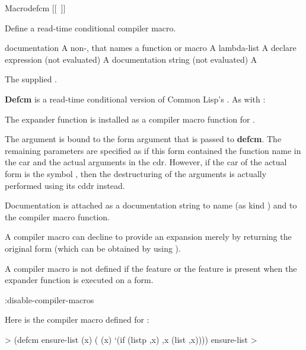 \documentclass[10pt,twoside,english,pdftex]{article}
\begin{document}
\begin{functiondoc}{Macro}{defcm}{ 
    \mbox{[[\superstar{} \vbar{} ]]}
    \superstar
    \returns{} }
%
%

\fnsyntax

\fnpurpose Define a read-time conditional compiler macro.

\fnpackage {}

\fnmodule {}

\fnargs
\begin{args}{documentation}
\arg[name] A non-\nil,  that names a function or macro
 A lambda-list
\arg[declaration] A declare expression (not evaluated)
\arg[documentation] A documentation string (not evaluated)
\arg[form] A 
\end{args}

\fnreturns The supplied .

\fndescription 
%
\textbf{Defcm} is a read-time conditional version of Common Lisp's
.  As with :
%
\begin{tightitemize}
\item The expander function is installed as a compiler macro function for
  .
\item The  argument is bound to the form argument that is passed
  to \textbf{defcm}. The remaining  parameters are
  specified as if this form contained the function name in the car and the
  actual arguments in the cdr.  However, if the car of the actual form is the
  symbol , then the destructuring of the arguments is actually
  performed using its cddr instead.
\item Documentation is attached as a documentation string to name (as kind
  ) and to the compiler macro function.
\item A compiler macro can decline to provide an expansion merely by returning
  the original form (which can be obtained by using ).
\end{tightitemize}
%
A compiler macro is not defined if the feature
\textbf{} or the feature
\textbf{} is present when the expander function is
executed on a form.

\begin{alsos}{:disable-compiler-macros}
\end{alsos}

\fnexample
%
%
%
%
Here is the compiler macro defined for \textbf{}:
%
\W\supp
\begin{example}
  > (defcm ensure-list (x)
      ( (x)
        `(if (listp ,x) ,x (list ,x))))
  ensure-list
  >
\end{example}

\end{functiondoc}
\end{document}
